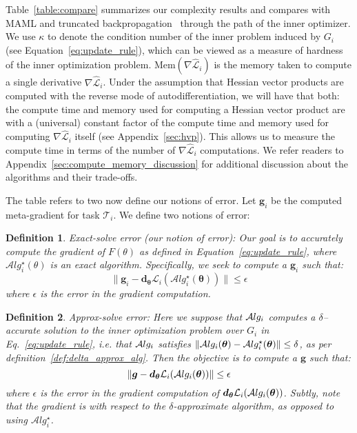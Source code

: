 \documentclass{article} \usepackage[nonatbib, final]{mod_neurips}
\newcommand{\task}{\mathcal{T}}
\newtheorem{definition}{Definition}
\newcommand{\prior}{{\bm{\theta}}}               \newcommand{\priorspace}{\Theta}
\newcommand{\fn}{\mathcal{L}}                  \newcommand{\udfn}{\tilde{\fn}}        \newcommand{\fnht}{\hat{\fn}}        \newcommand{\ud}{\alg}
\newcommand{\algstar}{\mathcal{A}lg^\star}
\newcommand{\eps}{\epsilon}
\newcommand{\grad}{\bm{d}}
\newcommand{\pgrad}{\nabla}
\begin{document}
Table~\ref{table:compare} summarizes our complexity results and compares with MAML and
truncated backpropagation~\cite{Shaban2018TruncatedBF} through the path of the inner optimizer. We
use $\kappa$ to denote the condition number of the inner problem
induced by $G_i$ (see Equation~\ref{eq:update_rule}), which can be
viewed as a measure of hardness of the inner optimization
problem. $\textrm{Mem}({\pgrad \fnht_i})$ is the memory taken to compute
a single derivative $\pgrad \fnht_i$. Under the assumption that
Hessian vector products are computed with the reverse mode of
autodifferentiation, we will have that both:
the compute time and memory used for computing a Hessian vector product
are with a (universal) constant factor of the compute time
and memory used for computing $\pgrad \fnht_i$ itself
(see Appendix~\ref{sec:hvp}). This allows us to measure
the compute time in terms of the number of $\pgrad \fnht_i$
computations. We refer readers to Appendix~\ref{sec:compute_memory_discussion} for additional discussion about the algorithms and their trade-offs.


\iffalse
The table refers to two now define our notions of error. Let $\bm{g}_i$ be the computed meta-gradient for task $\task_i$. We define two notions of error:

\begin{definition}
\label{def:exact_error}
Exact-solve error (our notion of error): Our goal
is to accurately compute the
gradient of $F(\theta)$ as defined in Equation~\ref {eq:update_rule},
where $\algstar_i(\theta)$ is an exact algorithm. Specifically, we seek to compute a $\bm{g}_i$ such that:
\[
\| \bm{g}_i - \grad_\prior \fn_i(\algstar_i(\prior)) \| \leq \eps
\]
where $\eps$ is the error in the gradient computation.
\end{definition}

\begin{definition}
\label{def:approx_error}
Approx-solve error: Here we suppose that $\mathcal{A}lg_i$ computes a $\delta$--accurate solution to the inner optimization problem over $G_i$ in Eq.~\ref{eq:update_rule}, i.e. that $\mathcal{A}lg_i$ satisfies $\| \alg_i(\prior) - \algstar_i(\prior) \| \leq \delta$, as per definition~\ref{def:delta_approx_alg}. Then the objective is to compute a $\bm{g}$ such that:
\[
\| \bm{g} - \grad_\prior \fn_i(\alg_i(\prior)) \| \leq \eps
\]
where $\eps$ is the error in the gradient computation of $\grad_\prior \fn_i(\alg_i(\prior))$. Subtly, note that the gradient is with respect to the $\delta$-approximate algorithm, as opposed to using $\algstar_i$.
\end{definition}
\end{document}
